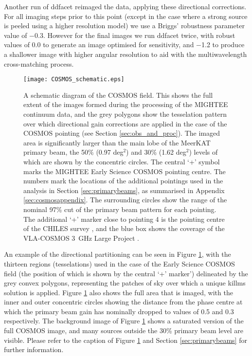 \documentclass[usenatbib,usedcolumn]{mnras}
\begin{document}
Another run of {\sc ddfacet} reimaged the data, applying these directional corrections. For all imaging steps prior to this point (except in the case where a strong source is peeled using a higher resolution model) we use a Briggs' robustness parameter value of $-$0.3. However for the final images we run {\sc ddfacet} twice, with robust values of 0.0 to generate an image optimised for sensitivity, and $-$1.2 to produce a shallower image with higher angular resolution to aid with the multiwavelength cross-matching process.

\begin{figure}
 \texttt{[image: COSMOS\_schematic.eps]}
 \caption{A schematic diagram of the COSMOS field. This shows the full extent of the images formed during the processing of the MIGHTEE continuum data, and the grey polygons show the tesselation pattern over which directional gain corrections are applied in the case of the COSMOS pointing (see Section \ref{sec:obs_and_proc}). The imaged area is significantly larger than the main lobe of the MeerKAT primary beam, the 50\% (0.97 deg$^{2}$) and 30\% (1.62 deg$^{2}$) levels of which are shown by the concentric circles. The central `+' symbol marks the MIGHTEE Early Science COSMOS pointing centre. The numbers mark the locations of the additional pointings used in the analysis in Section \ref{sec:primarybeams}, as summarised in Appendix \ref{sec:cosmosappendix}. The surrounding circles show the range of the nominal 97\% cut of the primary beam pattern for each pointing. The additional `+' marker close to pointing 4 is the pointing centre of the CHILES survey \citep{fernandez2013}, and the blue box shows the coverage of the VLA-COSMOS 3~GHz Large Project \citep{smolcic2017}.}
 \label{fig:schematic}
\end{figure}

An example of the directional partitioning can be seen in Figure \ref{fig:schematic}, with the thirteen regions (tesselations) used in the case of the Early Science COSMOS field (the position of which is shown by the central `+' marker') delineated by the grey convex polygons, representing the patches of sky over which a unique {\sc killms} solution is applied. Figure \ref{fig:schematic} also shows the full area that is imaged, with the inner and outer concentric circles showing the distance from the phase centre at which the primary beam gain has nominally dropped to values of 0.5 and 0.3 respectively. The background image of Figure \ref{fig:schematic} shows a saturated version of the full COSMOS image, and many sources outside the 30\% primary beam level are visible. Please refer to the caption of Figure \ref{fig:schematic} and Section \ref{sec:primarybeams} for further information.
\end{document}
